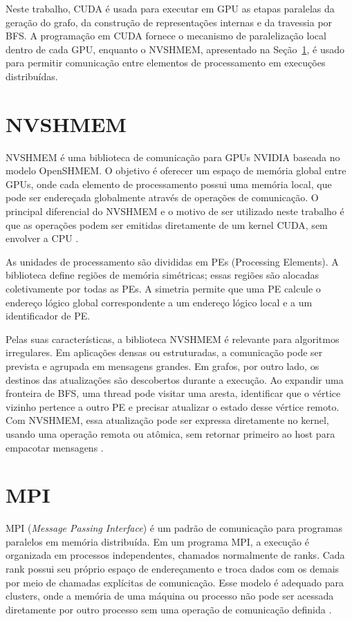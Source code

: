Neste trabalho, CUDA é usada para executar em GPU as etapas paralelas da geração
do grafo, da construção de representações internas e da travessia por BFS. A
programação em CUDA fornece o mecanismo de paralelização local dentro de cada
GPU, enquanto o NVSHMEM, apresentado na Seção~\ref{sec:nvshmem}, é usado para
permitir comunicação entre elementos de processamento em execuções distribuídas.

\section{NVSHMEM}
\label{sec:nvshmem}
NVSHMEM é uma biblioteca de comunicação para GPUs NVIDIA baseada no modelo OpenSHMEM. 
O objetivo é oferecer um espaço de memória global entre GPUs, onde cada elemento de 
processamento possui uma memória local, que pode ser endereçada globalmente através de
operações de comunicação. O principal diferencial do NVSHMEM e o motivo de ser utilizado
neste trabalho é que as operações podem ser emitidas diretamente de um kernel CUDA,
sem envolver a CPU \cite{hsunvshmem}.

As unidades de processamento são divididas em PEs (Processing Elements). A biblioteca define
regiões de memória simétricas; essas regiões são alocadas coletivamente por todas as PEs.
A simetria permite que uma PE calcule o endereço lógico global correspondente a um
endereço lógico local e a um identificador de PE.

Pelas suas características, a biblioteca NVSHMEM é relevante para algoritmos irregulares.
Em aplicações densas ou estruturadas, a comunicação pode ser prevista e agrupada
em mensagens grandes. Em grafos, por outro lado, os destinos das atualizações
são descobertos durante a execução. Ao expandir uma fronteira de BFS, uma thread
pode visitar uma aresta, identificar que o vértice vizinho pertence a outro PE e
precisar atualizar o estado desse vértice remoto. Com NVSHMEM, essa atualização
pode ser expressa diretamente no kernel, usando uma operação remota ou atômica,
sem retornar primeiro ao host para empacotar mensagens \cite{hsunvshmem}.

\section{MPI}
MPI (\textit{Message Passing Interface}) é um padrão de comunicação para
programas paralelos em memória distribuída. Em um programa MPI, a execução é
organizada em processos independentes, chamados normalmente de ranks. Cada rank
possui seu próprio espaço de endereçamento e troca dados com os demais por meio
de chamadas explícitas de comunicação. Esse modelo é adequado para clusters,
onde a memória de uma máquina ou processo não pode ser acessada diretamente por
outro processo sem uma operação de comunicação definida \cite{mpistandard}.

